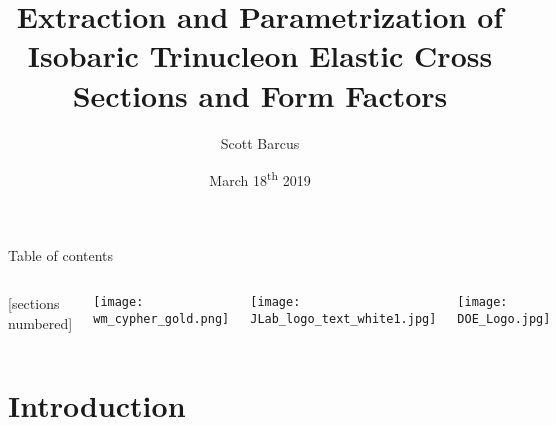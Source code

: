 \documentclass[10pt]{beamer}
\title{Extraction and Parametrization of Isobaric Trinucleon Elastic Cross Sections
and Form Factors}
\subtitle{}
\date{March 18\textsuperscript{th} 2019}
\author{Scott Barcus}
\institute{The College of William $\&$ Mary, Jefferson Lab}
\begin{document}
\maketitle

\begin{frame}{Table of contents}
  	\begin{columns}[T,onlytextwidth]

	\vspace{10mm}
  	[sections numbered]
  	\tableofcontents[hideallsubsections]
  
		\vspace{0mm}
		\begin{center}
		\texttt{[image: wm\_cypher\_gold.png]}
		\end{center}
		
		\vspace{1mm}
		\begin{center}
		\texttt{[image: JLab\_logo\_text\_white1.jpg]}
		\end{center}
		
		\vspace{1mm}
		\begin{center}
		\texttt{[image: DOE\_Logo.jpg]}
		\end{center}
	
\end{columns}
  
\end{frame}

\section{Introduction}
\end{document}
